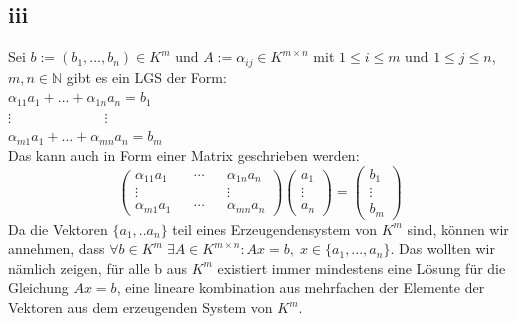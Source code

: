 \documentclass[10pt,a4paper]{article}
\begin{document}
 \subsection{iii}
 Sei $b := (b_1, ...,b_n) \in K^m$ und $A:=\alpha_{ij} \in K^{m\times n}$ mit $1\leq i\leq m \text{ und } 1\leq j \leq n$, $m,n \in \mathbb{N}$ gibt es ein LGS der Form: \\
 $ \alpha_{11}a_1+...+ \alpha_{1n}a_n = b_1 $\\
 $ \vdots \;\;\;\;\;\;\;\;\;\;\;\;\;\;\;\;\;\;\;\;\;\;\;\;  \vdots$ \\
 $ \alpha_{m1}a_1+...+ \alpha_{mn}a_n = b_m $\\
 Das kann auch in Form einer Matrix geschrieben werden:
 $$ 
 \begin{pmatrix}
	\alpha_{11}a_1 && \dotsb && \alpha_{1n}a_n \\ \vdots && && \vdots \\ \alpha_{m1}a_1 && \dotsb && \alpha_{mn}a_n 
 \end{pmatrix} 
 \begin{pmatrix}
	a_1 \\ \vdots \\ a_n 
 \end{pmatrix} =
 \begin{pmatrix}
	b_1 \\ \vdots \\ b_m
 \end{pmatrix} 
 $$
 Da die Vektoren $\{ a_1, .. a_n\}$ teil eines Erzeugendensystem von $K^m$ sind, können wir annehmen, dass $\forall b \in K^m \; \exists A \in K^{m\times n} : Ax=b, \; x \in \{a_1,...,a_n\}$.
 Das wollten wir nämlich zeigen, für alle b aus $K^m$ existiert immer mindestens eine Lösung für die Gleichung $Ax = b$, eine lineare kombination aus mehrfachen der Elemente der Vektoren aus dem erzeugenden System von $K^m$.
\end{document}
